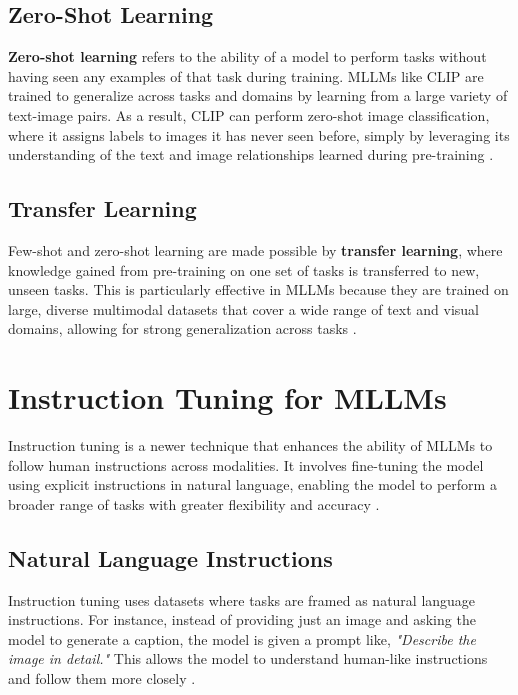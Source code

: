 \subsection{Zero-Shot Learning}

\textbf{Zero-shot learning} refers to the ability of a model to perform tasks without having seen any examples of that task during training. MLLMs like CLIP are trained to generalize across tasks and domains by learning from a large variety of text-image pairs. As a result, CLIP can perform zero-shot image classification, where it assigns labels to images it has never seen before, simply by leveraging its understanding of the text and image relationships learned during pre-training \cite{ZeroShotLearning2024}.

\subsection{Transfer Learning}

Few-shot and zero-shot learning are made possible by \textbf{transfer learning}, where knowledge gained from pre-training on one set of tasks is transferred to new, unseen tasks. This is particularly effective in MLLMs because they are trained on large, diverse multimodal datasets that cover a wide range of text and visual domains, allowing for strong generalization across tasks \cite{TransferLearning2024}.

\section{Instruction Tuning for MLLMs}

Instruction tuning is a newer technique that enhances the ability of MLLMs to follow human instructions across modalities. It involves fine-tuning the model using explicit instructions in natural language, enabling the model to perform a broader range of tasks with greater flexibility and accuracy \cite{InstructionTuning2024}.

\subsection{Natural Language Instructions}

Instruction tuning uses datasets where tasks are framed as natural language instructions. For instance, instead of providing just an image and asking the model to generate a caption, the model is given a prompt like, \textit{"Describe the image in detail."} This allows the model to understand human-like instructions and follow them more closely \cite{NaturalLanguageInstructions2024}.

